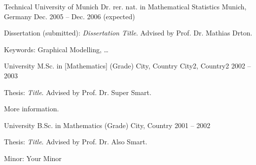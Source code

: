 
\begin{cventries}

  \cventry    
    {Technical University of Munich}
    {Dr. rer. nat. in Mathematical Statistics}
    {Munich, Germany}
    {Dec. 2005 -- Dec. 2006 (expected)}
    {
      \begin{cvitems}
        \item {Dissertation (submitted): \textit{Dissertation Title}. Advised by Prof. Dr. Mathias Drton.}
        \item {Keywords: Graphical Modelling, \dots}
      \end{cvitems}
    }

  \cventry
    {University}
    {M.Sc. in [Mathematics] (Grade)}
    {City, Country \newline City2, Country2}
    {2002 -- 2003}
    {
      \begin{cvitems}
        \item {Thesis: \textit{Title}. Advised by Prof. Dr. Super Smart.}
        \item {More information.}
      \end{cvitems}
    }

  \cventry
    {University }
    {B.Sc. in Mathematics (Grade)}
    {City, Country}
    {2001 -- 2002}
    {\begin{cvitems} 
    \item Thesis: \textit{Title}. Advised by Prof. Dr. Also Smart.
    \item Minor: Your Minor
    \end{cvitems}}

\end{cventries}
